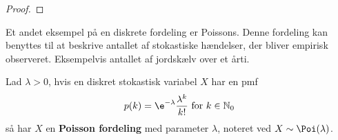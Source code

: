 \begin{proof}
\end{proof}


Et andet eksempel på en diskrete fordeling er Poissons. Denne fordeling kan benyttes til at beskrive antallet af stokastiske hændelser, der bliver empirisk observeret. Eksempelvis antallet af jordskælv over et årti.
\begin{defn}\label{def:poisson}
    Lad $\lambda>0$, hvis en diskret stokastisk variabel $X$ har en pmf
    \begin{align*}
         p(k)=\e^{-\lambda}\frac{\lambda^k}{k!}\text{ for } k\in\mathbb{N}_0
    \end{align*}
    så har $X$ en \textbf{Poisson fordeling} med parameter $\lambda$, noteret ved $X\sim\Poi(\lambda)$.
\end{defn}

